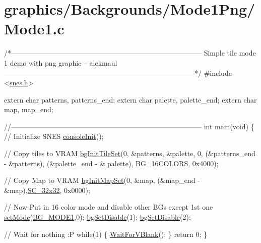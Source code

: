 \hypertarget{a00409}{}\section{graphics/\+Backgrounds/\+Mode1\+Png/\+Mode1.\+c}

\begin{DoxyCodeInclude}
\textcolor{comment}{/*---------------------------------------------------------------------------------}
\textcolor{comment}{}
\textcolor{comment}{}
\textcolor{comment}{    Simple tile mode 1 demo with png graphic}
\textcolor{comment}{    -- alekmaul}
\textcolor{comment}{}
\textcolor{comment}{}
\textcolor{comment}{---------------------------------------------------------------------------------*/}
\textcolor{preprocessor}{#include <\hyperlink{a00371}{snes.h}>}

\textcolor{keyword}{extern} \textcolor{keywordtype}{char} patterns, patterns\_end;
\textcolor{keyword}{extern} \textcolor{keywordtype}{char} palette, palette\_end;
\textcolor{keyword}{extern} \textcolor{keywordtype}{char} map, map\_end;

\textcolor{comment}{//---------------------------------------------------------------------------------}
\textcolor{keywordtype}{int} main(\textcolor{keywordtype}{void}) \{
    \textcolor{comment}{// Initialize SNES }
    \hyperlink{a00335_a6047713bb5a73afd3cd1d77e336bcdad}{consoleInit}();
     
    \textcolor{comment}{// Copy tiles to VRAM}
    \hyperlink{a00332_ae09a7ac09be78eef0f28a6c7aabc82ad}{bgInitTileSet}(0, &patterns, &palette, 0, (&patterns\_end - &patterns), (&palette\_end - &
      palette), BG\_16COLORS, 0x4000);

    \textcolor{comment}{// Copy Map to VRAM}
    \hyperlink{a00332_acc385296e159449a81d18f5e219c8032}{bgInitMapSet}(0, &map, (&map\_end - &map),\hyperlink{a00332_a11724b6748ce0954e9b43819263537fc}{SC\_32x32}, 0x0000);

    \textcolor{comment}{// Now Put in 16 color mode and disable other BGs except 1st one}
    \hyperlink{a00368_afd9e46ae627d055dd8c98a4b0ebb73b1}{setMode}(\hyperlink{a00332_a05c862edb7f8f75036f10c04dcc3c2a6}{BG\_MODE1},0);  \hyperlink{a00332_a4dbfb1b8854ff9ca4a7d11a899281bbb}{bgSetDisable}(1); 
      \hyperlink{a00332_a4dbfb1b8854ff9ca4a7d11a899281bbb}{bgSetDisable}(2);
    
    \textcolor{comment}{// Wait for nothing :P}
    \textcolor{keywordflow}{while}(1) \{
        \hyperlink{a00341_a815e2626bd26d0e936d507a363ecd723}{WaitForVBlank}();
    \}
    \textcolor{keywordflow}{return} 0;
\}
\end{DoxyCodeInclude}
 